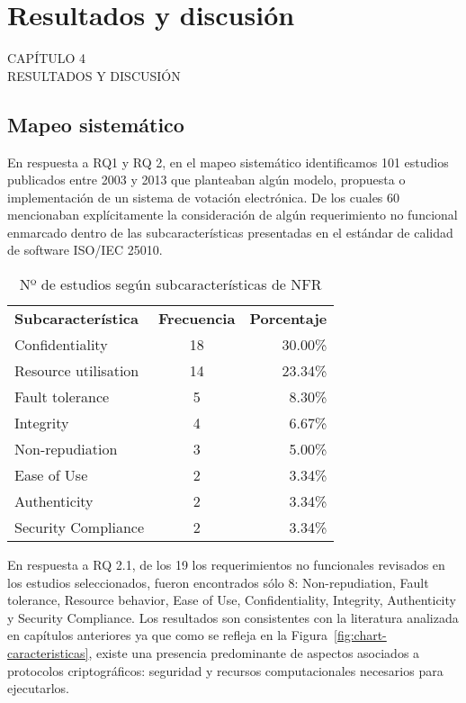 
{

\Hide
\chapter{Resultados y discusión}
}

\begin{titular} 
	\uppercase{
	capítulo 4 \\
	Resultados y discusión \\
	}
\end{titular}

\section{Mapeo sistemático}

En respuesta a RQ1 y  RQ 2, en el mapeo sistemático identificamos 101 estudios publicados entre 
2003 y 2013 que planteaban algún modelo, propuesta o implementación de un sistema de votación 
electrónica.  De los cuales 60 mencionaban explícitamente la consideración de algún 
requerimiento no funcional enmarcado dentro de las subcaracterísticas presentadas en el estándar
de calidad de software ISO/IEC 25010. 

\begin{table}[h!]
\centering
\caption{Nº de estudios según subcaracterísticas de NFR}
\label{tab:estudios-subcaracteristicas}
\begin{tabularx}{0.8\textwidth}{X c r} 
\toprule[1.5pt]
	\bf	Subcaracterística	& 	\bf Frecuencia	& \bf Porcentaje \\ 
	Confidentiality			&	18			& 30.00\% \\
	Resource utilisation		&	14			& 23.34\% \\
	Fault tolerance			&	5			& 8.30\% \\
	Integrity 				&	4			& 6.67\% \\
	Non-repudiation		&	3			& 5.00\% \\
	Ease of Use			&	2			& 3.34\% \\
	Authenticity			&	2			& 3.34\% \\
	Security Compliance	&	2			& 3.34\% \\
\bottomrule[0.5pt]
\end {tabularx}
\end{table}
\bigskip

En respuesta a RQ 2.1, de los 19 los requerimientos no funcionales revisados en los estudios
seleccionados, fueron encontrados sólo 8: Non-repudiation, Fault tolerance, Resource behavior, Ease of Use, 
Confidentiality, Integrity, Authenticity y Security Compliance. Los resultados son consistentes 
con la literatura analizada en capítulos anteriores ya que como se refleja 
en la Figura~\ref{fig:chart-caracteristicas}, existe una presencia predominante de aspectos
asociados a protocolos criptográficos: seguridad y recursos computacionales necesarios para 
ejecutarlos.

